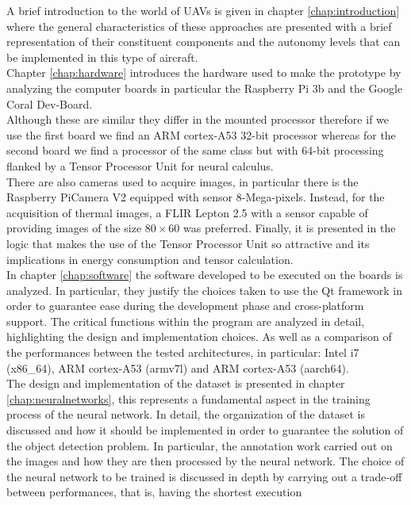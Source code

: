 \noindent A brief introduction to the world of UAVs is given in chapter
\ref{chap:introduction} where the general characteristics of these approaches
are presented with a brief representation of their constituent components and
the autonomy levels that can be implemented in this type of aircraft.\\
\noindent Chapter \ref{chap:hardware} introduces the hardware used to make the
prototype by analyzing the computer boards in particular the Raspberry Pi 3b and
the Google Coral Dev-Board.\\
Although these are similar they differ in the mounted processor therefore if we
use the first board we find an ARM cortex-A53 32-bit processor whereas for the
second board we find a processor of the same class but with 64-bit processing
flanked by a Tensor Processor Unit for neural calculus.\\
There are also cameras used to acquire images, in particular there is the
Raspberry PiCamera V2 equipped with sensor 8-Mega-pixels. 
Instead, for the acquisition of thermal images, a FLIR Lepton 2.5 with a sensor
capable of providing images of the size $ 80 \times 60 $ was preferred.
Finally, it is presented in the logic that makes the use of the Tensor Processor
Unit so attractive and its implications in energy consumption and tensor
calculation.\\
\noindent In chapter \ref{chap:software} the software developed to be executed
on the boards is analyzed. 
In particular, they justify the choices taken to use the Qt framework in
order to guarantee ease during the development phase and cross-platform support.
The critical functions within the program are analyzed in detail, highlighting
the design and implementation choices.
As well as a comparison of the performances between the tested architectures, in
particular: Intel i7 (x86\_64), ARM cortex-A53 (armv7l) and ARM cortex-A53
(aarch64).\\
\noindent The design and implementation of the dataset is presented in chapter
\ref{chap:neuralnetworks}, this represents a fundamental aspect in the training
process of the neural network.
In detail, the organization of the dataset is discussed and how it should be
implemented in order to guarantee the solution of the object detection problem.
In particular, the annotation work carried out on the images and how they are
then processed by the neural network.
The choice of the neural network to be trained is discussed in depth by carrying
out a trade-off between performances, that is, having the shortest execution
